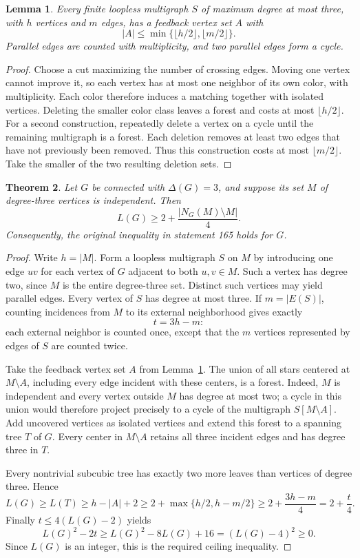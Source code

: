 \documentclass[11pt,a4paper]{article}
\newtheorem{theorem}{Theorem}[section]
\newtheorem{lemma}[theorem]{Lemma}
\theoremstyle{definition}\newtheorem{definition}[theorem]{Definition}
\theoremstyle{remark}\newtheorem{remark}[theorem]{Remark}
\begin{document}
\begin{lemma}\label{r12leaf:multigraph}
Every finite loopless multigraph $S$ of maximum degree at most three,
with $h$ vertices and $m$ edges, has a feedback vertex set $A$ with
\[
 |A|\leq\min\{\lfloor h/2\rfloor,\lfloor m/2\rfloor\}.
\]
Parallel edges are counted with multiplicity, and two parallel edges
form a cycle.
\end{lemma}
\begin{proof}
Choose a cut maximizing the number of crossing edges. Moving one
vertex cannot improve it, so each vertex has at most one neighbor
of its own color, with multiplicity. Each color therefore induces
a matching together with isolated vertices. Deleting the smaller
color class leaves a forest and costs at most $\lfloor h/2\rfloor$.
For a second construction, repeatedly delete a vertex on a cycle
until the remaining multigraph is a forest. Each deletion removes
at least two edges that have not previously been removed. Thus this
construction costs at most $\lfloor m/2\rfloor$. Take the smaller
of the two resulting deletion sets.
\end{proof}

\begin{theorem}\label{r12leaf:165class}
Let $G$ be connected with $\Delta(G)=3$, and suppose its set $M$ of
degree-three vertices is independent. Then
\[
 L(G)\geq2+\frac{|N_G(M)\setminus M|}{4}.
\]
Consequently, the original inequality in statement 165 holds for $G$.
\end{theorem}
\begin{proof}
Write $h=|M|$. Form a loopless multigraph $S$ on $M$ by introducing
one edge $uv$ for each vertex of $G$ adjacent to both $u,v\in M$.
Such a vertex has degree two, since $M$ is the entire degree-three
set. Distinct such vertices may yield parallel edges. Every vertex
of $S$ has degree at most three. If $m=|E(S)|$, counting incidences
from $M$ to its external neighborhood gives exactly
\[
 t=3h-m:
\]
each external neighbor is counted once, except that the $m$ vertices
represented by edges of $S$ are counted twice.

Take the feedback vertex set $A$ from Lemma~\ref{r12leaf:multigraph}.
The union of all stars centered at $M\setminus A$, including every
edge incident with these centers, is a forest. Indeed, $M$ is
independent and every vertex outside $M$ has degree at most two;
a cycle in this union would therefore project precisely to a cycle
of the multigraph $S[M\setminus A]$. Add uncovered vertices as
isolated vertices and extend this forest to a spanning tree $T$ of
$G$. Every center in $M\setminus A$ retains all three incident
edges and has degree three in $T$.

Every nontrivial subcubic tree has exactly two more leaves than
vertices of degree three. Hence
\[
 L(G)\geq L(T)\geq h-|A|+2
 \geq 2+\max\{h/2,h-m/2\}
 \geq2+\frac{3h-m}{4}=2+\frac t4.
\]
Finally $t\leq4(L(G)-2)$ yields
\[
 L(G)^2-2t\geq L(G)^2-8L(G)+16=(L(G)-4)^2\geq0.
\]
Since $L(G)$ is an integer, this is the required ceiling inequality.
\end{proof}
\end{document}
